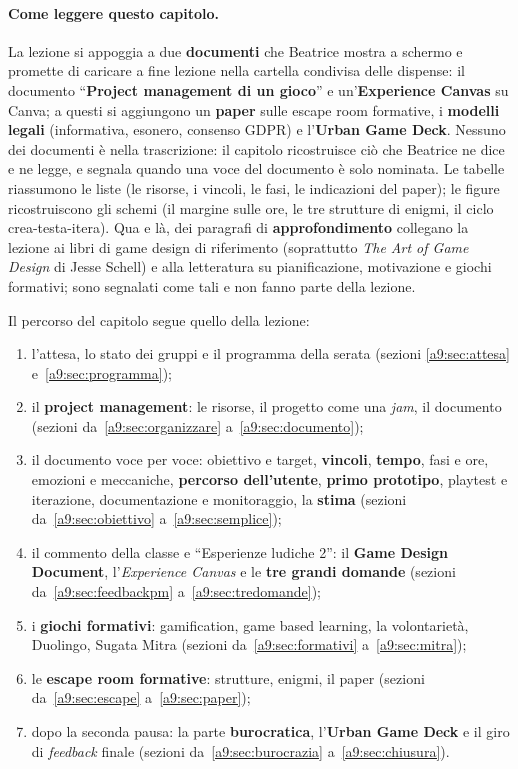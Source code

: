 \paragraph{Come leggere questo capitolo.} La lezione si appoggia a due
\textbf{documenti} che Beatrice mostra a schermo e promette di caricare a fine
lezione nella cartella condivisa delle dispense: il documento ``\textbf{Project
management di un gioco}'' e un'\textbf{Experience Canvas} su Canva; a questi si
aggiungono un \textbf{paper} sulle escape room formative, i \textbf{modelli legali}
(informativa, esonero, consenso GDPR) e l'\textbf{Urban Game Deck}. Nessuno dei
documenti è nella trascrizione: il capitolo ricostruisce ciò che Beatrice ne dice e
ne legge, e segnala quando una voce del documento è solo nominata. Le tabelle
riassumono le liste (le risorse, i vincoli, le fasi, le indicazioni del paper);
le figure ricostruiscono gli schemi (il margine sulle ore, le tre strutture di
enigmi, il ciclo crea-testa-itera). Qua e là, dei paragrafi di
\textbf{approfondimento} collegano la lezione ai libri di game design di riferimento
(soprattutto \emph{The Art of Game Design} di Jesse Schell) e alla letteratura su
pianificazione, motivazione e giochi formativi; sono segnalati come tali e non fanno
parte della lezione.

Il percorso del capitolo segue quello della lezione:
\begin{enumerate}
  \item l'attesa, lo stato dei gruppi e il programma della serata (sezioni
        \ref{a9:sec:attesa} e~\ref{a9:sec:programma});
  \item il \textbf{project management}: le risorse, il progetto come una
        \emph{jam}, il documento (sezioni da~\ref{a9:sec:organizzare}
        a~\ref{a9:sec:documento});
  \item il documento voce per voce: obiettivo e target, \textbf{vincoli},
        \textbf{tempo}, fasi e ore, emozioni e meccaniche, \textbf{percorso
        dell'utente}, \textbf{primo prototipo}, playtest e iterazione,
        documentazione e monitoraggio, la \textbf{stima} (sezioni
        da~\ref{a9:sec:obiettivo} a~\ref{a9:sec:semplice});
  \item il commento della classe e ``Esperienze ludiche 2'': il \textbf{Game
        Design Document}, l'\emph{Experience Canvas} e le \textbf{tre grandi
        domande} (sezioni da~\ref{a9:sec:feedbackpm} a~\ref{a9:sec:tredomande});
  \item i \textbf{giochi formativi}: gamification, game based learning, la
        volontarietà, Duolingo, Sugata Mitra (sezioni da~\ref{a9:sec:formativi}
        a~\ref{a9:sec:mitra});
  \item le \textbf{escape room formative}: strutture, enigmi, il paper (sezioni
        da~\ref{a9:sec:escape} a~\ref{a9:sec:paper});
  \item dopo la seconda pausa: la parte \textbf{burocratica}, l'\textbf{Urban
        Game Deck} e il giro di \emph{feedback} finale (sezioni
        da~\ref{a9:sec:burocrazia} a~\ref{a9:sec:chiusura}).
\end{enumerate}


